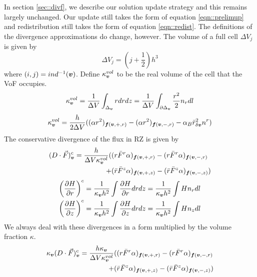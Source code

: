 In section \ref{sec::divf}, we describe our solution update
strategy and this remains largely unchanged.  Our update still takes
the form of equation \ref{eqn::prelimup} and redistribution still
takes the form of equation \ref{eqn::redist}.   The definitions of the
divergence approximations do change, however.  The volume of a full
cell $\Delta V_j$   is given by
\begin{equation}
\Delta V_j = (j + \frac{1}{2}) h^3
\end{equation}
where $(i,j)= ind^{-1}({\boldsymbol{v}})$.  Define $\kappa^{vol}_{\boldsymbol{v}}$ to be
the real volume of the cell that the VoF occupies.
\begin{equation}
\kappa^{vol}_{\boldsymbol{v}} = 
\frac{1}{\Delta V}\int_{\Delta_{\boldsymbol{v}}} r dr dz = 
\frac{1}{\Delta V}\int_{\partial \Delta_{\boldsymbol{v}}} \frac{r^2}{2} n_r dl
\end{equation}
\begin{equation}
\kappa^{vol}_{\boldsymbol{v}} = 
\frac{h}{2 \Delta V}((\alpha r^2)_{{\boldsymbol{f}}({\boldsymbol{v}},+,r)} -
(\alpha r^2)_{{\boldsymbol{f}}({\boldsymbol{v}},-,r)}- \alpha_B \bar{r}^2_{\delta {\boldsymbol{v}}} n^r)
\end{equation}
The conservative divergence of the flux in RZ is given by
\begin{gather}
\begin{align*}
(D \cdot \vec{F})^c_{\boldsymbol{v}} = \frac{h}{\Delta V \kappa^{vol}_{\boldsymbol{v}}}
( &(r \bar{F}^r \alpha)_{{\boldsymbol{f}}({\boldsymbol{v}},+,r)} - (r \bar{F}^r \alpha)_{{\boldsymbol{f}}({\boldsymbol{v}},-,r)} \\
+ &(\bar{r}\bar{F}^z \alpha)_{{\boldsymbol{f}}({\boldsymbol{v}},+,z)} - (\bar{r} \bar{F}^z\alpha)_{{\boldsymbol{f}}({\boldsymbol{v}},-,z)} )  
\end{align*}
\label{eqn::consdivrz}
\end{gather}
\begin{gather}
\begin{align*}
\left(\frac{\partial H}{\partial r}\right)^c &=  
\frac{1}{\kappa_{\boldsymbol{v}} h^2} \int \frac{\partial H}{\partial r} dr dz  = 
\frac{1}{\kappa_{\boldsymbol{v}} h^2} \int H n_r dl  \\
\left(\frac{\partial H}{\partial z}\right)^c &=  
\frac{1}{\kappa_{\boldsymbol{v}} h^2} \int \frac{\partial H}{\partial z} dr dz  = 
\frac{1}{\kappa_{\boldsymbol{v}} h^2} \int H n_z dl  
\end{align*}
\end{gather}
We always deal with these divergences in a form multiplied by the
volume fraction $\kappa$.
\begin{gather}
\begin{align*}
\kappa_{\boldsymbol{v}} (D \cdot \vec{F})^c_{\boldsymbol{v}} =
\frac{h \kappa_{\boldsymbol{v}}}{\Delta V \kappa^{vol}_{\boldsymbol{v}}}
&( (r \bar{F}^r \alpha)_{{\boldsymbol{f}}({\boldsymbol{v}},+,r)} - (r \bar{F}^r \alpha)_{{\boldsymbol{f}}({\boldsymbol{v}},-,r)} \\
+ &(\bar{r}\bar{F}^z \alpha)_{{\boldsymbol{f}}({\boldsymbol{v}},+,z)} - (\bar{r} \bar{F}^z \alpha)_{{\boldsymbol{f}}({\boldsymbol{v}},-,z)})  
\end{align*}
\end{gather}
